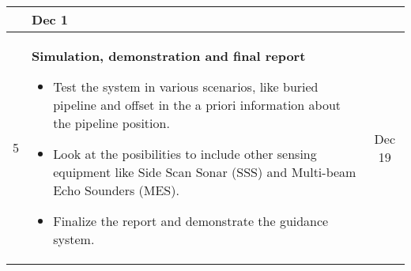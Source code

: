 \documentclass[a4paper,10pt]{article}
\begin{document}
\begin{tabular}{| c | p{8.5cm} || c |}
								&	Dec 1 \\
	\hline
	5	&	\textbf{Simulation, demonstration and final report}
						\begin{itemize}
						 \item Test the system in various scenarios, like buried pipeline and offset in the a priori information about the pipeline position.
						 \item Look at the posibilities to include other sensing equipment like Side Scan Sonar (SSS) and Multi-beam Echo Sounders (MES).
						 \item Finalize the report and demonstrate the guidance system.
						\end{itemize}
								&	Dec 19 \\
	\hline
	\end{tabular}
\end{document}
